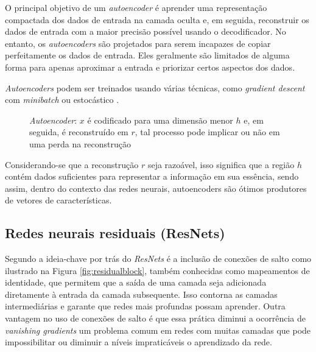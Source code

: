 			\par O principal objetivo de um \textit{autoencoder} é aprender uma representação compactada dos dados de entrada na camada oculta e, em seguida, reconstruir os dados de entrada com a maior precisão possível usando o decodificador. No entanto, os \textit{autoencoders} são projetados para serem incapazes de copiar perfeitamente os dados de entrada. Eles geralmente são limitados de alguma forma para apenas aproximar a entrada e priorizar certos aspectos dos dados. \newline
			
			\par \textit{Autoencoders} podem ser treinados usando várias técnicas, como \textit{gradient descent} com \textit{minibatch} ou estocástico \cite{Goodfellow-et-al-2016}.
	
			\begin{figure}[h]
				\centering
				\caption[autoencoder]{\textit{Autoencoder}: $x$ é codificado para uma dimensão menor $h$ e, em seguida, é reconstruído em $r$, tal processo pode implicar ou não em uma perda na reconstrução}
				
				\label{fig:autoencoder}
			\end{figure}
			
			\par Considerando-se que a reconstrução $r$ seja razoável, isso significa que a região $h$  contém dados suficientes para representar a informação em sua essência, sendo assim, dentro do contexto das redes neurais, autoencoders são ótimos produtores de vetores de características.
	
		\subsection{Redes neurais residuais (ResNets)}
			\par Segundo \cite{DBLP:journals/corr/HeZRS15} a ideia-chave por trás do \textit{ResNets} é a inclusão de conexões de salto como ilustrado na Figura \ref{fig:residualblock}, também conhecidas como mapeamentos de identidade, que permitem que a saída de uma camada seja adicionada diretamente à entrada da camada subsequente. Isso contorna as camadas intermediárias e garante que redes mais profundas possam aprender. Outra vantagem no uso de conexões de salto é que essa prática diminui a ocorrência de \textit{vanishing gradients} um problema comum em redes com muitas camadas que pode impossibilitar ou diminuir a níveis impraticáveis o aprendizado da rede.
			
